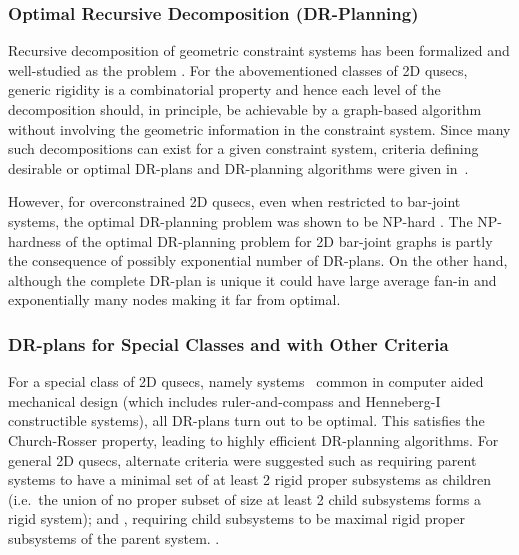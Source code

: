 \subsubsection{Optimal Recursive Decomposition (DR-Planning)}
Recursive decomposition of geometric constraint systems has been formalized \cite{hoffman2001decompositionI,hoffman2001decompositionII} and well-studied \cite{lomonosov2004graph,sitharam2005combinatorial,jermann2006decomposition} as the  problem \seedefsprelim. For the abovementioned classes of 2D qusecs, generic rigidity is a combinatorial property and hence each level of the decomposition should, in principle, be achievable by a graph-based algorithm without involving the geometric information in the constraint system. Since many such decompositions can exist for a given constraint system, criteria defining desirable or optimal DR-plans and DR-planning algorithms were given in~\cite{hoffman2001decompositionI}.

However, for overconstrained 2D qusecs, even when restricted to bar-joint systems, the optimal DR-planning problem was shown to be NP-hard \cite{lomonosov2004graph, sitharam2005combinatorial}.
The NP-hardness of the optimal DR-planning problem for 2D bar-joint graphs is partly the consequence of possibly exponential number of DR-plans. On the other hand, although the complete DR-plan is unique it could have large average fan-in and exponentially many nodes making it far from optimal.

\subsubsection{DR-plans for Special Classes and with Other Criteria}
For a special class of 2D qusecs, namely  systems~\cite{owen1991algebraic,fudos1997graph,joan-arinyo2004revisiting} common in computer aided mechanical design (which includes ruler-and-compass and Henneberg-I constructible systems), all DR-plans turn out to be optimal. This satisfies the Church-Rosser property, leading to highly efficient DR-planning algorithms. For general 2D qusecs, alternate criteria were suggested such as  requiring parent systems to have a minimal set of at least 2 rigid proper subsystems as children (i.e.\ the union of no proper subset of size at least 2 child subsystems forms a rigid system); and , requiring child subsystems to be maximal rigid proper subsystems of the parent system. \seedefsc.

